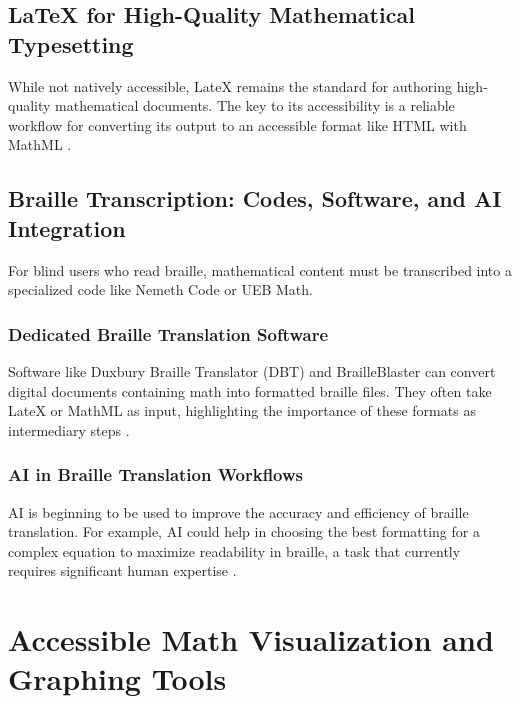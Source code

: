 \subsection{LaTeX for High-Quality Mathematical Typesetting}\label{ch11:ssec:latex}
While not natively accessible, \gls{LateX} remains the standard for authoring high-quality mathematical documents. The key to its accessibility is a reliable workflow for converting its output to an accessible format like HTML with \gls{MathML} \supercite{LaTeXProject, LaTeXMathematics}.

\subsection{Braille Transcription: Codes, Software, and AI Integration}\label{ch11:ssec:braille}
For blind users who read braille, mathematical content must be transcribed into a specialized code like Nemeth Code or UEB Math.

\subsubsection{Dedicated Braille Translation Software}\label{ch11:sssec:braille-software}
Software like Duxbury Braille Translator (DBT) and BrailleBlaster can convert digital documents containing math into formatted braille files. They often take \gls{LateX} or \gls{MathML} as input, highlighting the importance of these formats as intermediary steps \supercite{Duxbury, BrailleBlaster}.

\subsubsection{AI in Braille Translation Workflows}\label{ch11:sssec:ai-braille}
\gls{AI} is beginning to be used to improve the accuracy and efficiency of braille translation. For example, \gls{AI} could help in choosing the best formatting for a complex equation to maximize readability in braille, a task that currently requires significant human expertise \supercite{AIBrailleTranslation, AIGenMath}.

\section{Accessible Math Visualization and Graphing Tools}\label{ch11:sec:visualization}
